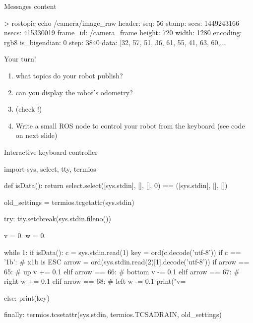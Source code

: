 \documentclass[compress]{beamer}
\begin{document}
\begin{frame}[fragile]{Messages content}
\begin{shcode}
> rostopic echo /camera/image_raw 
header: 
    seq: 56
    stamp: 
      secs: 1449243166
      nsecs: 415330019
    frame_id: /camera_frame
height: 720
width: 1280
encoding: rgb8
is_bigendian: 0
step: 3840
data: [32, 57, 51, 36, 61, 55, 41, 63, 60,...
\end{shcode}
\end{frame}

\begin{frame}[plain]{}
    \begin{center}
        \Large
        Your turn!

        \begin{enumerate}
            \item what topics do your robot publish?
            \item can you display the robot's odometry?
            \item \small{(check !)}
            \item Write a small ROS node to control your robot from the
                keyboard (see code on next slide)

        \end{enumerate}
    \end{center}
\end{frame}

\begin{frame}[fragile]{Interactive keyboard controller}
\begin{pythoncode}
import sys, select, tty, termios

def isData():
    return select.select([sys.stdin], [], [], 0) == ([sys.stdin], [], [])

old_settings = termios.tcgetattr(sys.stdin)

try:
    tty.setcbreak(sys.stdin.fileno())

    v = 0.
    w = 0.

    while 1:
        if isData():
            c = sys.stdin.read(1)
            key = ord(c.decode('utf-8'))
            if c == '\x1b':         # x1b is ESC
                arrow = ord(sys.stdin.read(2)[1].decode('utf-8'))
                if arrow == 65: # up 
                    v += 0.1
                elif arrow == 66: # bottom
                    v -= 0.1
                elif arrow == 67: # right 
                    w += 0.1
                elif arrow == 68: # left 
                    w -= 0.1
                print("v=%

            else:
                print(key)

finally:
    termios.tcsetattr(sys.stdin, termios.TCSADRAIN, old_settings)
\end{pythoncode}
\end{frame}
\end{document}
